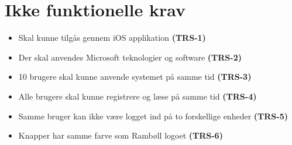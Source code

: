 \section{Ikke funktionelle krav} \label{sec:Ikkefunktionelle}
\begin{itemize}[-]
	\itemsep 0.3em 
	\item Skal kunne tilgås gennem iOS applikation \textbf{(TRS-1)}
	\item Der skal anvendes Microsoft teknologier og software \textbf{(TRS-2)}
	\item 10 brugere skal kunne anvende systemet på samme tid \textbf{(TRS-3)}
	\item Alle brugere skal kunne registrere og læse på samme tid \textbf{(TRS-4)}
	\item Samme bruger kan ikke være logget ind på to forskellige enheder \textbf{(TRS-5)}
	\item Knapper har samme farve som Rambøll logoet \textbf{(TRS-6)}
\end{itemize}

\clearpage